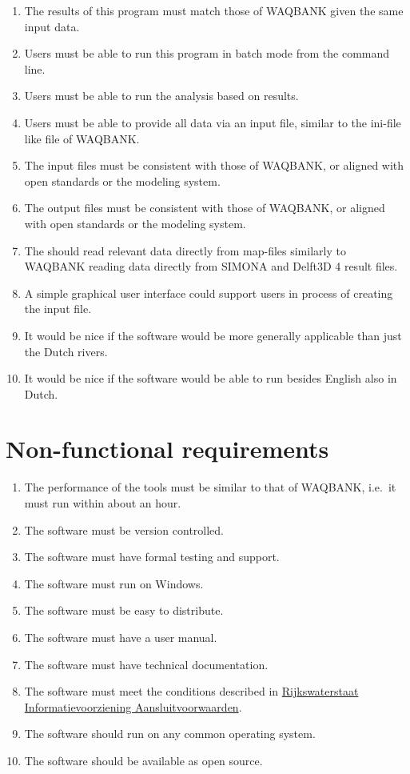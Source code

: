 \begin{enumerate}
\item The results of this program must match those of WAQBANK given the same input data.
\item Users must be able to run this program in batch mode from the command line.
\item Users must be able to run the analysis based on \dflowfm results.
\item Users must be able to provide all data via an input file, similar to the ini-file like file of WAQBANK.
\item The input files must be consistent with those of WAQBANK, or aligned with open standards or the \dflowfm modeling system.
\item The output files must be consistent with those of WAQBANK, or aligned with open standards or the \dflowfm modeling system.

\item The should read relevant data directly from \dflowfm map-files similarly to WAQBANK reading data directly from SIMONA and Delft3D 4 result files.

\item A simple graphical user interface could support users in process of creating the input file.

\item It would be nice if the software would be more generally applicable than just the Dutch rivers.
\item It would be nice if the software would be able to run besides English also in Dutch.
\end{enumerate}

\section{Non-functional requirements}

\begin{enumerate}
\item The performance of the tools must be similar to that of WAQBANK, i.e.~it must run within about an hour.
\item The software must be version controlled.
\item The software must have formal testing and support.
\item The software must run on Windows.
\item The software must be easy to distribute.
\item The software must have a user manual.
\item The software must have technical documentation.
\item The software must meet the conditions described in \href{http://publicaties.minienm.nl/documenten/rijkswaterstaat-informatievoorziening-aansluitvoorwaarden-riva-2017}{Rijkswaterstaat Informatievoorziening Aansluitvoorwaarden}.

\item The software should run on any common operating system.
\item The software should be available as open source.
\end{enumerate}